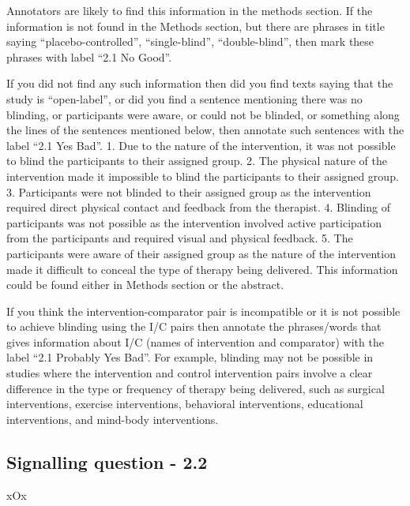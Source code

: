 \documentclass[sn-mathphys,Numbered]{sn-jnl}%
\begin{document}
Annotators are likely to find this information in the methods section.
If the information is not found in the Methods section, but there are phrases in title saying ``placebo-controlled'', ``single-blind'', ``double-blind'', then mark these phrases with label ``2.1 No Good''.

If you did not find any such information then did you find texts saying that the study is ``open-label'', or did you find a sentence mentioning there was no blinding, or participants were aware, or could not be blinded, or something along the lines of the sentences mentioned below, then annotate such sentences with the label ``2.1 Yes Bad''.
1. Due to the nature of the intervention, it was not possible to blind the participants to their assigned group.
2. The physical nature of the intervention made it impossible to blind the participants to their assigned group.
3. Participants were not blinded to their assigned group as the intervention required direct physical contact and feedback from the therapist.
4. Blinding of participants was not possible as the intervention involved active participation from the participants and required visual and physical feedback.
5. The participants were aware of their assigned group as the nature of the intervention made it difficult to conceal the type of therapy being delivered.
This information could be found either in Methods section or the abstract.

If you think the intervention-comparator pair is incompatible or it is not possible to achieve blinding using the I/C pairs then annotate the phrases/words that gives information about I/C (names of intervention and comparator) with the label ``2.1 Probably Yes Bad''.
For example, blinding may not be possible in studies where the intervention and control intervention pairs involve a clear difference in the type or frequency of therapy being delivered, such as surgical interventions, exercise interventions, behavioral interventions, educational interventions, and mind-body interventions.
%
%
%
\subsection*{Signalling question - 2.2}
\label{subsec:2_2}
%
xOx
%
%
%
\end{document}
